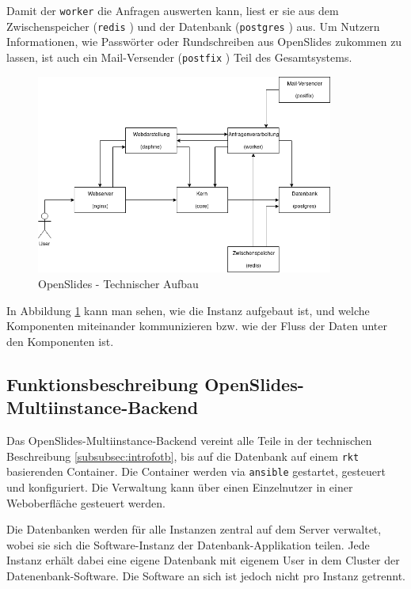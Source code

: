 \documentclass[11pt,a4paper]{article}
\begin{document}
Damit der \texttt{worker} die Anfragen auswerten kann, liest er sie aus dem 
Zwischenspeicher (\texttt{redis} \cite{redis}) und der Datenbank 
(\texttt{postgres} \cite{postgres}) aus. Um Nutzern Informationen, wie 
Passwörter oder Rundschreiben aus OpenSlides zukommen zu lassen, ist auch ein 
Mail-Versender (\texttt{postfix} \cite{postfixhp}) Teil des Gesamtsystems.

\begin{figure}[htp]
	\centering
	\includegraphics[width=0.87\textwidth]{img/techn_besch.png}
	\caption[OpenSlides - Technischer Aufbau]{OpenSlides - Technischer Aufbau}
	\label{fig:ostechbesch}
\end{figure}

In Abbildung \ref{fig:ostechbesch} kann man sehen, wie die Instanz aufgebaut 
ist, und welche Komponenten miteinander kommunizieren bzw. wie der Fluss der 
Daten unter den Komponenten ist.
\newpage
\subsection{Funktionsbeschreibung OpenSlides-Multiinstance-Backend} 
\label{subsec:introfomb}
Das OpenSlides-Multiinstance-Backend \cite{osmib} vereint alle Teile in der 
technischen Beschreibung \ref{subsubsec:introfotb}, bis auf die 
Datenbank auf einem \texttt{rkt} \cite{rkthp} basierenden Container. Die 
Container werden via \texttt{ansible} \cite{ansible} gestartet, gesteuert und 
konfiguriert. Die Verwaltung kann über einen Einzelnutzer in einer 
Weboberfläche gesteuert werden.

Die Datenbanken werden für alle Instanzen zentral auf dem Server verwaltet, wobei 
sie sich die Software-Instanz der Datenbank-Applikation teilen. Jede Instanz 
erhält dabei eine eigene Datenbank mit eigenem User in dem Cluster der 
Datenenbank-Software. Die Software an sich ist jedoch nicht pro Instanz 
getrennt.
\end{document}
